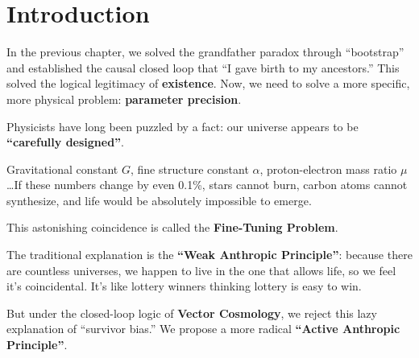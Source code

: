 \section{Introduction}

In the previous chapter, we solved the grandfather paradox through ``bootstrap'' and established the causal closed loop that ``I gave birth to my ancestors.'' This solved the logical legitimacy of \textbf{existence}. Now, we need to solve a more specific, more physical problem: \textbf{parameter precision}.

Physicists have long been puzzled by a fact: our universe appears to be \textbf{``carefully designed''}.

Gravitational constant $G$, fine structure constant $\alpha$, proton-electron mass ratio $\mu$\ldots If these numbers change by even 0.1\%, stars cannot burn, carbon atoms cannot synthesize, and life would be absolutely impossible to emerge.

This astonishing coincidence is called the \textbf{Fine-Tuning Problem}.

The traditional explanation is the \textbf{``Weak Anthropic Principle''}: because there are countless universes, we happen to live in the one that allows life, so we feel it's coincidental. It's like lottery winners thinking lottery is easy to win.

But under the closed-loop logic of \textbf{Vector Cosmology}, we reject this lazy explanation of ``survivor bias.'' We propose a more radical \textbf{``Active Anthropic Principle''}.

